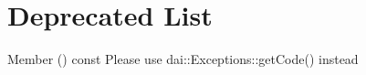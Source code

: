 \chapter{Deprecated List}
\hypertarget{deprecated}{}\label{deprecated}

\begin{DoxyRefList}
\item[Member \doxylink{classdai_1_1Exception_abf78e57aba055dacbfa2f46033b467cb}{dai\+::Exception\+::code} () const]\label{deprecated__deprecated000001}%
%
Please use dai\+::\+Exceptions\+::get\+Code() instead 
\end{DoxyRefList}